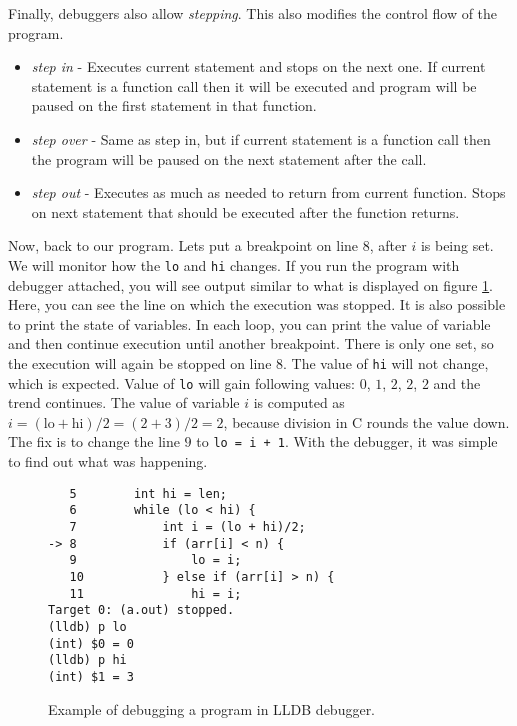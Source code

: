 Finally, debuggers also allow \textit{stepping}. This also modifies the control flow of the program.
\begin{itemize}
    \item \textit{step in} - Executes current statement and stops on the next one. If current statement is a function call then
                    it will be executed and program will be paused on the first statement in that function.
    \item \textit{step over} - Same as step in, but if current statement is a function call then the program will
                      be paused on the next statement after the call.
    \item \textit{step out} -  Executes as much as needed to return from current function. Stops on next statement that
                      should be executed after the function returns.
\end{itemize}

Now, back to our program. Lets put a breakpoint on line $8$, after $i$ is being set. We will monitor how the \texttt{lo} and \texttt{hi}
changes. If you run the program with debugger attached, you will see output similar to what is displayed on figure \ref{fig:lldb-debug1}.
Here, you can see the line on which the execution was stopped. It is also possible to print the state of variables. In each loop,
you can print the value of variable and then continue execution until another breakpoint. There is only one set, so the execution will
again be stopped on line $8$. The value of \texttt{hi} will not change, which is expected. Value of \texttt{lo} will gain following values:
$0$, $1$, $2$, $2$, $2$ and the trend continues. The value of variable $i$ is computed as $i = (\text{lo} + \text{hi})/2 = (2 + 3)/2 = 2$,
because division in C rounds the value down. The fix is to change the
line $9$ to \texttt{lo = i + 1}. With the debugger, it was simple to find out what was happening.

\begin{figure}\label{fig:lldb-debug1}
\begin{verbatim}
   5   	    int hi = len;
   6   	    while (lo < hi) {
   7   	        int i = (lo + hi)/2;
-> 8   	        if (arr[i] < n) {
   9   	            lo = i;
   10  	        } else if (arr[i] > n) {
   11  	            hi = i;
Target 0: (a.out) stopped.
(lldb) p lo
(int) $0 = 0
(lldb) p hi
(int) $1 = 3
\end{verbatim}
\caption{Example of debugging a program in LLDB debugger.}
\end{figure}

